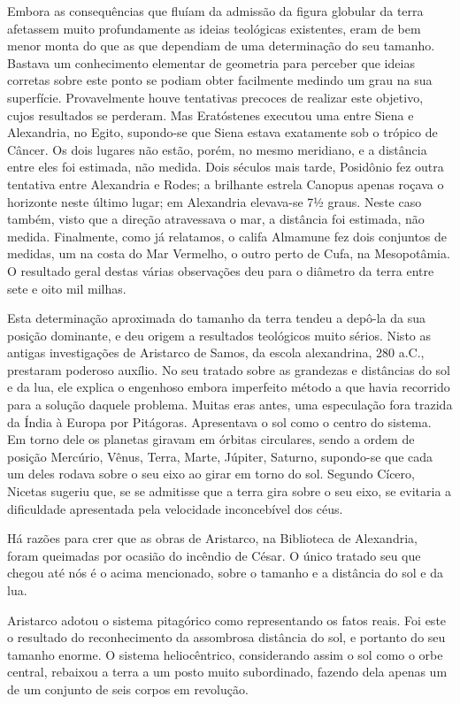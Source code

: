 \documentclass[11pt,a5paper,twoside,openany]{book}
\begin{document}
Embora as consequências que fluíam da admissão da figura globular da terra afetassem muito profundamente as ideias teológicas existentes, eram de bem menor monta do que as que dependiam de uma determinação do seu tamanho. Bastava um conhecimento elementar de geometria para perceber que ideias corretas sobre este ponto se podiam obter facilmente medindo um grau na sua superfície. Provavelmente houve tentativas precoces de realizar este objetivo, cujos resultados se perderam. Mas Eratóstenes executou uma entre Siena e Alexandria, no Egito, supondo-se que Siena estava exatamente sob o trópico de Câncer. Os dois lugares não estão, porém, no mesmo meridiano, e a distância entre eles foi estimada, não medida. Dois séculos mais tarde, Posidônio fez outra tentativa entre Alexandria e Rodes; a brilhante estrela Canopus apenas roçava o horizonte neste último lugar; em Alexandria elevava-se 7½ graus. Neste caso também, visto que a direção atravessava o mar, a distância foi estimada, não medida. Finalmente, como já relatamos, o califa Almamune fez dois conjuntos de medidas, um na costa do Mar Vermelho, o outro perto de Cufa, na Mesopotâmia. O resultado geral destas várias observações deu para o diâmetro da terra entre sete e oito mil milhas.

Esta determinação aproximada do tamanho da terra tendeu a depô-la da sua posição dominante, e deu origem a resultados teológicos muito sérios. Nisto as antigas investigações de Aristarco de Samos, da escola alexandrina, 280 a.C., prestaram poderoso auxílio. No seu tratado sobre as grandezas e distâncias do sol e da lua, ele explica o engenhoso embora imperfeito método a que havia recorrido para a solução daquele problema. Muitas eras antes, uma especulação fora trazida da Índia à Europa por Pitágoras. Apresentava o sol como o centro do sistema. Em torno dele os planetas giravam em órbitas circulares, sendo a ordem de posição Mercúrio, Vênus, Terra, Marte, Júpiter, Saturno, supondo-se que cada um deles rodava sobre o seu eixo ao girar em torno do sol. Segundo Cícero, Nicetas sugeriu que, se se admitisse que a terra gira sobre o seu eixo, se evitaria a dificuldade apresentada pela velocidade inconcebível dos céus.

Há razões para crer que as obras de Aristarco, na Biblioteca de Alexandria, foram queimadas por ocasião do incêndio de César. O único tratado seu que chegou até nós é o acima mencionado, sobre o tamanho e a distância do sol e da lua.

Aristarco adotou o sistema pitagórico como representando os fatos reais. Foi este o resultado do reconhecimento da assombrosa distância do sol, e portanto do seu tamanho enorme. O sistema heliocêntrico, considerando assim o sol como o orbe central, rebaixou a terra a um posto muito subordinado, fazendo dela apenas um de um conjunto de seis corpos em revolução.
\end{document}
